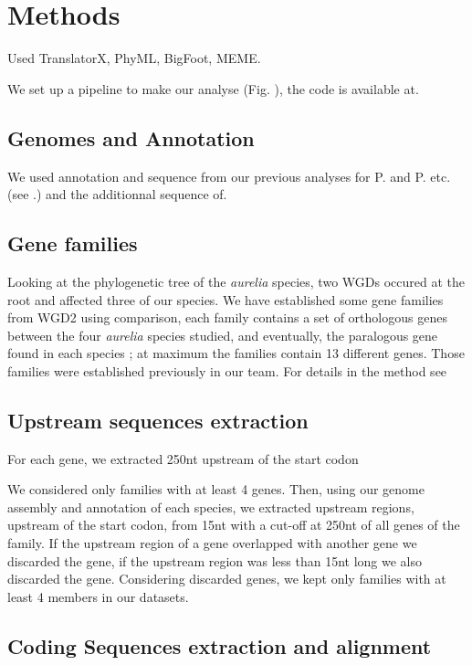 \section*{Methods}

Used TranslatorX, PhyML, BigFoot, MEME.

We set up a pipeline to make our analyse (Fig. ), the code is available at.

\subsection*{Genomes and Annotation}

We used annotation and sequence from our previous analyses for P. and P. etc. (see .) and the additionnal sequence of.

\subsection*{Gene families}

Looking at the phylogenetic tree of the \textit{aurelia} species, two WGDs occured at the root and affected three of our species. We have established some gene families from WGD2 using comparison, each family contains a set of orthologous genes between the four \textit{aurelia} species studied, and eventually, the paralogous gene found in each species ; at maximum the families contain 13 different genes. Those families were established previously in our team. For details in the method see

\subsection*{Upstream sequences extraction}

For each gene, we extracted 250nt upstream of the start codon

We considered only families with at least 4 genes. Then, using our genome assembly and annotation of each species, we extracted upstream regions, upstream of the start codon, from 15nt with a cut-off at 250nt of all genes of the family. If the upstream region of a gene overlapped with another gene we discarded the gene, if the upstream region was less than 15nt long we also discarded the gene. Considering discarded genes, we kept only families with at least 4 members in our datasets.

\subsection*{Coding Sequences extraction and alignment}

